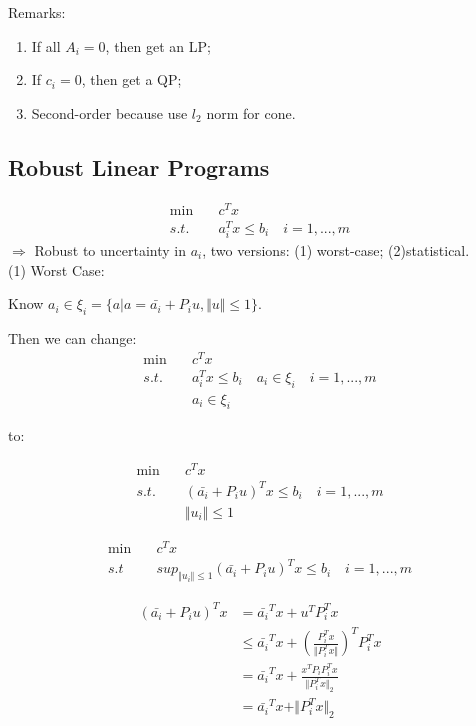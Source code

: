 Remarks:

\begin{enumerate}
	\item If all $A_i = 0$, then get an LP;
	
	\item If $c_i = 0$, then get a QP;
	
	\item Second-order because use $l_2$ norm for cone.
\end{enumerate}

\subsection{Robust Linear Programs}

\begin{align*}
\min \quad&c^Tx\\
s.t. \quad&a_i^Tx\leq b_i\quad i = 1,...,m
\end{align*}
$\Rightarrow$ Robust to uncertainty in $a_i$, two versions: (1) worst-case; (2)statistical.\\

(1) Worst Case:

Know $a_i\in \xi_i = \{a\vert a = \bar{a_i} + P_iu, \Vert u \Vert\leq 1 \} $. 

Then we can change:
\begin{align*}
\min\quad &c^Tx\\
s.t. \quad&a_i^Tx\leq b_i\quad a_i \in \xi_i \quad i = 1,...,m\\
&a_i\in\xi_i
\end{align*}

to:

\begin{align*}
\min \quad&c^Tx\\
s.t. \quad&(\bar{a_i} + P_iu)^Tx\leq b_i\quad i = 1,...,m\\
&\Vert u_i\Vert \leq 1
\end{align*}

\begin{align*}
\min\quad &c^Tx\\
s.t \quad&sup_{\Vert u_i\Vert \leq 1}(\bar{a_i} + P_iu)^Tx\leq b_i\quad i = 1,...,m
\end{align*}

\begin{align*}
(\bar{a_i} + P_iu)^Tx &= \bar{a_i}^Tx + u^TP_i^Tx \\
&\leq \bar{a_i}^Tx + (\frac{P_i^Tx}{\Vert P_i^Tx\Vert})^TP_i^Tx\\
&= \bar{a_i}^Tx + \frac{x^TP_iP_i^Tx}{\Vert P_i^Tx\Vert_2}\\
&= \bar{a_i}^Tx + \Vert P_i^Tx\Vert_2
\end{align*}\\

